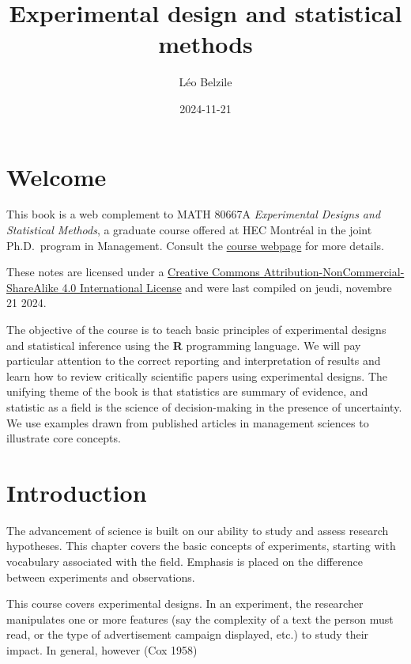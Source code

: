 \documentclass[
  11pt,
  letterpaper,
]{scrbook}
\title{Experimental design and statistical methods}
\author{Léo Belzile}
\date{2024-11-21}
\renewcommand*\contentsname{Table of contents}
\newcommand\contentsname{Table of contents}
\theoremstyle{definition}
\theoremstyle{definition}
\theoremstyle{remark}
\begin{document}


\renewcommand*\contentsname{Table of contents}
{
\setcounter{tocdepth}{2}
\tableofcontents
}

\mainmatter
{}

\chapter*{Welcome}\label{welcome}


This book is a web complement to MATH 80667A \emph{Experimental Designs
and Statistical Methods}, a graduate course offered at HEC Montréal in
the joint Ph.D.~program in Management. Consult the
\href{https://lbelzile.github.io/experimental}{course webpage} for more
details.

These notes are licensed under a
\href{http://creativecommons.org/licenses/by-nc-sa/4.0/}{Creative
Commons Attribution-NonCommercial-ShareAlike 4.0 International License}
and were last compiled on jeudi, novembre 21 2024.

The objective of the course is to teach basic principles of experimental
designs and statistical inference using the \textbf{R} programming
language. We will pay particular attention to the correct reporting and
interpretation of results and learn how to review critically scientific
papers using experimental designs. The unifying theme of the book is
that statistics are summary of evidence, and statistic as a field is the
science of decision-making in the presence of uncertainty. We use
examples drawn from published articles in management sciences to
illustrate core concepts.


\chapter{Introduction}\label{introduction}

The advancement of science is built on our ability to study and assess
research hypotheses. This chapter covers the basic concepts of
experiments, starting with vocabulary associated with the field.
Emphasis is placed on the difference between experiments and
observations.

This course covers experimental designs. In an experiment, the
researcher manipulates one or more features (say the complexity of a
text the person must read, or the type of advertisement campaign
displayed, etc.) to study their impact. In general, however (Cox 1958)
\end{document}
